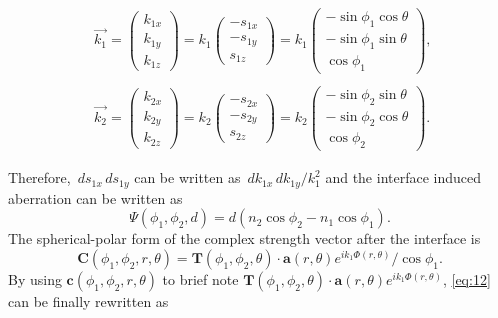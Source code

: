 \documentclass[9pt,twocolumn,twoside]{osajnl}
\begin{document}
\begin{equation}\label{eq:13}
	\begin{aligned}
		&\vec{k_1}=\begin{pmatrix}
			k_{1x}\\
			k_{1y}\\
			k_{1z}
		\end{pmatrix}=k_1	
		\begin{pmatrix}
			-s_{1x}\\
			-s_{1y}\\
			s_{1z}	
		\end{pmatrix}=k_1
		\begin{pmatrix}
			-\sin\phi_1\cos\theta\\
			-\sin\phi_1\sin\theta\\
			\cos\phi_1	
		\end{pmatrix},\,\,\\\\
	&\vec{k_2}=\begin{pmatrix}
		k_{2x}\\
		k_{2y}\\
		k_{2z}
	\end{pmatrix}=k_2	
		\begin{pmatrix}
			-s_{2x}\\
			-s_{2y}\\
			s_{2z}	
		\end{pmatrix}=k_2
		\begin{pmatrix}
			-\sin\phi_2\sin\theta\\
			-\sin\phi_2\cos\theta\\
			\cos\phi_2	
		\end{pmatrix}.		
	\end{aligned}
\end{equation}

Therefore, $\,ds_{1x}\,ds_{1y}$ can be written as $\,dk_{1x}\,dk_{1y}/k_1^2$ and the interface induced aberration can be written as 
\begin{equation}\label{eq:14}
	\Psi(\phi_1,\phi_2,d)=d(n_2\cos\phi_2-n_1\cos\phi_1).
\end{equation}
The spherical-polar form of the complex strength vector after the interface is
\begin{equation}\label{eq:15}
	\mathbf{C}(\phi_1,\phi_2,r,\theta)=\mathbf{T}(\phi_1,\phi_2,\theta)\cdot\mathbf{a}(r,\theta)e^{ik_1\Phi(r,\theta)}/\cos\phi_1.
\end{equation}
By using $\mathbf{c}(\phi_1,\phi_2,r,\theta)$ to brief note $\mathbf{T}(\phi_1,\phi_2,\theta)\cdot\mathbf{a}(r,\theta)e^{ik_1\Phi(r,\theta)}$, \eqref{eq:12} can be finally rewritten as
\end{document}
